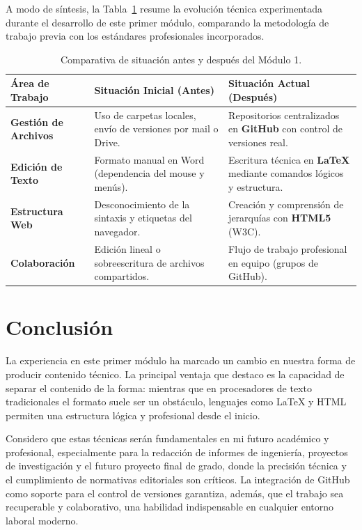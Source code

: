 \documentclass[runningheads]{llncs}
\begin{document}
A modo de síntesis, la Tabla~\ref{tab_comparativa} resume la evolución técnica experimentada durante el desarrollo de este primer módulo, comparando la metodología de trabajo previa con los estándares profesionales incorporados.

\begin{table}[h!]
\centering
\caption{Comparativa de situación antes y después del Módulo 1.}
\label{tab_comparativa}
\begin{tabular}{|l|p{4.5cm}|p{4.5cm}|}
\hline
\textbf{Área de Trabajo} & \textbf{Situación Inicial (Antes)} & \textbf{Situación Actual (Después)} \\ \hline
\textbf{Gestión de Archivos} & Uso de carpetas locales, envío de versiones por mail o Drive. & Repositorios centralizados en \textbf{GitHub} con control de versiones real. \\ \hline
\textbf{Edición de Texto} & Formato manual en Word (dependencia del mouse y menús). & Escritura técnica en \textbf{LaTeX} mediante comandos lógicos y estructura. \\ \hline
\textbf{Estructura Web} & Desconocimiento de la sintaxis y etiquetas del navegador. & Creación y comprensión de jerarquías con \textbf{HTML5} (W3C). \\ \hline
\textbf{Colaboración} & Edición lineal o sobreescritura de archivos compartidos. & Flujo de trabajo profesional en equipo (grupos de GitHub). \\ \hline
\end{tabular}
\end{table}

\section{Conclusión}
La experiencia en este primer módulo ha marcado un cambio en nuestra forma de producir contenido técnico. La principal ventaja que destaco es la capacidad de separar el contenido de la forma: mientras que en procesadores de texto tradicionales el formato suele ser un obstáculo, lenguajes como LaTeX y HTML permiten una estructura lógica y profesional desde el inicio.

Considero que estas técnicas serán fundamentales en mi futuro académico y profesional, especialmente para la redacción de informes de ingeniería, proyectos de investigación y el futuro proyecto final de grado, donde la precisión técnica y el cumplimiento de normativas editoriales son críticos. La integración de GitHub como soporte para el control de versiones garantiza, además, que el trabajo sea recuperable y colaborativo, una habilidad indispensable en cualquier entorno laboral moderno.
\end{document}
